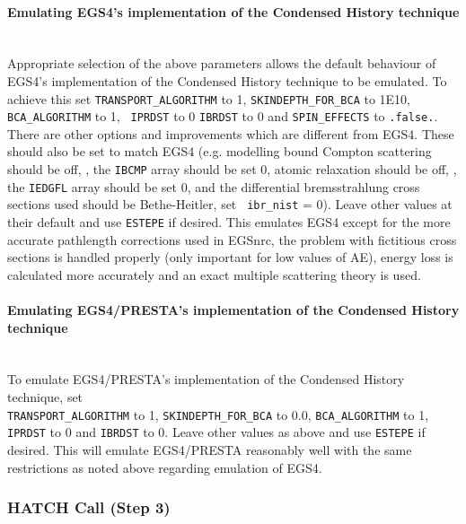 \paragraph{Emulating  EGS4's implementation of the Condensed History
technique} \mbox{}\\
\label{mimic}
Appropriate selection of the above parameters allows the default
behaviour of  EGS4's implementation of the Condensed History technique
to be emulated. To achieve this set {\tt TRANSPORT\_ALGORITHM} to 1,
{\tt SKINDEPTH\_FOR\_BCA} to 1E10, {\tt BCA\_ALGORITHM} to 1, {\tt
IPRDST} to 0 {\tt IBRDST} to 0 and {\tt SPIN\_EFFECTS} to {\tt .false.}.
There are other options and improvements which are different from EGS4. These should also be set to match
EGS4 (e.g. modelling bound Compton scattering should be off, \ie,  the
{\tt IBCMP} array should be set 0, atomic relaxation should be
off, \ie, the {\tt IEDGFL} array should be set 0,  and the differential
bremsstrahlung cross sections used should be Bethe-Heitler, \ie set {\tt
ibr\_nist} = 0).  Leave other values at their default and use {\tt ESTEPE}
if desired.  This emulates EGS4 except for the more accurate pathlength
corrections used in EGSnrc, the problem with fictitious cross sections
is handled properly (only important for low values of AE), energy loss
is calculated more accurately and an exact multiple scattering theory
is used.

\paragraph{Emulating EGS4/PRESTA's implementation of the Condensed History
technique} \mbox{}\\
To emulate  EGS4/PRESTA's implementation of the Condensed History
technique, set \\
{\tt TRANSPORT\_ALGORITHM} to 1, {\tt SKINDEPTH\_FOR\_BCA}
to 0.0, {\tt BCA\_ALGORITHM} to 1, {\tt IPRDST} to 0 and {\tt IBRDST} to 0. Leave
other values as above and use {\tt ESTEPE} if desired. This will
emulate  EGS4/PRESTA reasonably well with the same restrictions as noted
above regarding emulation of EGS4.


 \subsubsection{HATCH Call (Step 3)}
\label{step_3}


